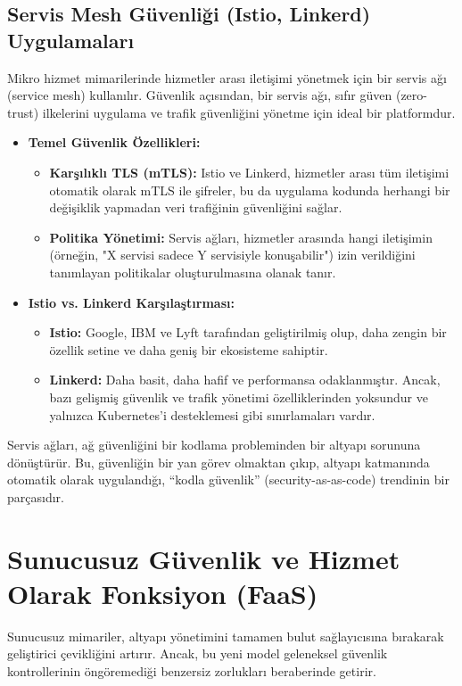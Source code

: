 \subsection{Servis Mesh Güvenliği (Istio, Linkerd) Uygulamaları}

Mikro hizmet mimarilerinde hizmetler arası iletişimi yönetmek için bir servis ağı (service mesh) kullanılır. Güvenlik açısından, bir servis ağı, sıfır güven (zero-trust) ilkelerini uygulama ve trafik güvenliğini yönetme için ideal bir platformdur.

\begin{itemize}
    \item \textbf{Temel Güvenlik Özellikleri:}
    \begin{itemize}
        \item \textbf{Karşılıklı TLS (mTLS):} Istio ve Linkerd, hizmetler arası tüm iletişimi otomatik olarak mTLS ile şifreler, bu da uygulama kodunda herhangi bir değişiklik yapmadan veri trafiğinin güvenliğini sağlar.
        \item \textbf{Politika Yönetimi:} Servis ağları, hizmetler arasında hangi iletişimin (örneğin, "X servisi sadece Y servisiyle konuşabilir") izin verildiğini tanımlayan politikalar oluşturulmasına olanak tanır.
    \end{itemize}
    \item \textbf{Istio vs. Linkerd Karşılaştırması:}
    \begin{itemize}
        \item \textbf{Istio:} Google, IBM ve Lyft tarafından geliştirilmiş olup, daha zengin bir özellik setine ve daha geniş bir ekosisteme sahiptir.
        \item \textbf{Linkerd:} Daha basit, daha hafif ve performansa odaklanmıştır. Ancak, bazı gelişmiş güvenlik ve trafik yönetimi özelliklerinden yoksundur ve yalnızca Kubernetes'i desteklemesi gibi sınırlamaları vardır.
    \end{itemize}
\end{itemize}
Servis ağları, ağ güvenliğini bir kodlama probleminden bir altyapı sorununa dönüştürür. Bu, güvenliğin bir yan görev olmaktan çıkıp, altyapı katmanında otomatik olarak uygulandığı, “kodla güvenlik” (security-as-as-code) trendinin bir parçasıdır.

\section{Sunucusuz Güvenlik ve Hizmet Olarak Fonksiyon (FaaS)}
Sunucusuz mimariler, altyapı yönetimini tamamen bulut sağlayıcısına bırakarak geliştirici çevikliğini artırır. Ancak, bu yeni model geleneksel güvenlik kontrollerinin öngöremediği benzersiz zorlukları beraberinde getirir.


